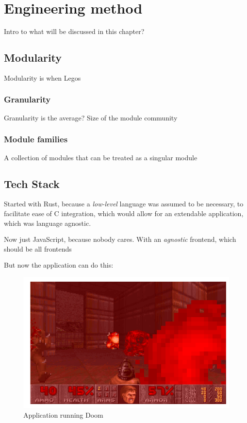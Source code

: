 \chapter{Engineering method}

Intro to what will be discussed in this chapter?

\section{Modularity}

Modularity is when Legos

\subsection{Granularity}

Granularity is the average? Size of the module community

\subsection{Module families}

A collection of modules that can be treated as a singular module

\section{Tech Stack}

Started with Rust, because a \textit{low-level} language was assumed to be
necessary, to facilitate ease of C integration, which would allow for an
extendable application, which was language agnostic.

Now just JavaScript, because nobody cares. With an \textit{agnostic} frontend,
which should be all frontends

But now the application can do this:

\begin{figure}
  \centering
  \includegraphics[scale=0.5]{./pics/doom}
  \caption{Application running Doom}
\end{figure}

